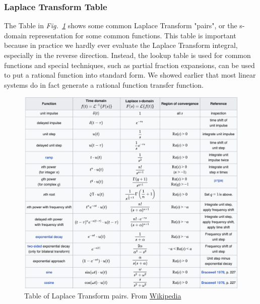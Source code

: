 \subsubsection{Laplace Transform Table}
The Table in \emph{Fig.~\ref{fig:laplace_xform}} shows some common Laplace Transform "pairs", or the s-domain representation for some common functions.   This table is important because in practice we hardly ever evaluate the Laplace Transform integral, especially in the reverse direction.  Instead, the lookup table is used for common functions and special techniques, such as partial fraction expansions, can be used to put a rational function into standard form.  We showed earlier that most linear systems do in fact generate a rational function transfer function.  
\begin{figure}[tb]
\centering
\includegraphics[width=\columnwidth]{laplace_transform.png}
\caption{Table of Laplace Transform pairs.  From \href{https://en.wikipedia.org/wiki/Laplace_transform}{Wikipedia}}
\label{fig:laplace_xform}
\end{figure}
